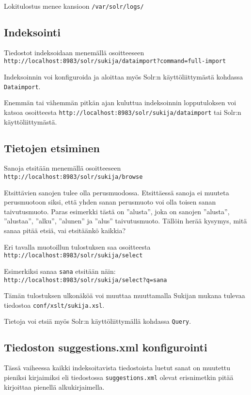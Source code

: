 \documentclass[12pt]{article}
\begin{document}
Lokitulostus menee kansioon \verb=/var/solr/logs/=


\subsection*{Indeksointi}

Tiedostot indeksoidaan menemällä osoitteeseen
\verb|http://localhost:8983/solr/sukija/dataimport?command=full-import|

Indeksoinnin voi konfiguroida ja aloittaa myös Solr:n käyttöliittymästä
kohdassa \verb|Dataimport|.

Enemmän tai vähemmän pitkän ajan kuluttua indeksoinnin lopputuloksen
voi katsoa osoitteesta
\verb|http://localhost:8983/solr/sukija/dataimport|
tai Solr:n käyttöliittymästä.


\subsection*{Tietojen etsiminen}

Sanoja etsitään menemällä osoitteeseen
\verb=http://localhost:8983/solr/sukija/browse=

Etsittävien sanojen tulee olla perusmuodossa. Etsittäessä sanoja ei
muuteta perusmuotoon siksi, että yhden sanan perusmuoto voi olla
toisen sanan taivutusmuoto. Paras esimerkki tästä on ''alusta'', joka
on sanojen ''alusta'', ''alustaa'', ''alku'', ''alunen'' ja ''alus''
taivutusmuoto. Tällöin herää kysymys, mitä sanaa pitää etsiä, vai
etsitäänkö kaikkia?


Eri tavalla muotoillun tulostuksen saa osoitteesta
\verb=http://localhost:8983/solr/sukija/select=

Esimerkiksi sanaa \verb=sana= etsitään näin:
\verb|http://localhost:8983/solr/sukija/select?q=sana|

Tämän tulostuksen ulkonäköä voi muuttaa muuttamalla Sukijan mukana
tulevaa tiedostoa \verb=conf/xslt/sukija.xsl=.

Tietoja voi etsiä myös Solr:n käyttöliittymällä kohdassa \verb|Query|.


\subsection*{Tiedoston suggestions.xml konfigurointi}

Tässä vaiheessa kaikki indeksoitavista tiedostoista luetut sanat on
muutettu pieniksi kirjaimiksi eli tiedostossa
\verb|suggestions.xml| olevat erisnimetkin pitää kirjoittaa
pienellä alkukirjaimella.
\end{document}
